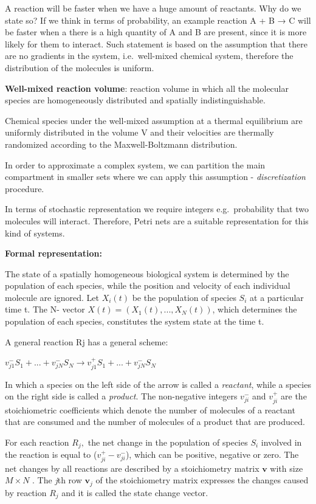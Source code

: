 A reaction will be faster when we have a huge amount of reactants. Why
do we state so? If we think in terms of probability, an example reaction
A + B → C will be faster when a there is a high quantity of A and B are
present, since it is more likely for them to interact. Such statement is
based on the assumption that there are no gradients in the system,
i.e.~well-mixed chemical system, therefore the distribution of the
molecules is uniform.

\textbf{Well-mixed reaction volume}: reaction volume in which all the
molecular species are homogeneously distributed and spatially
indistinguishable.

Chemical species under the well-mixed assumption at a thermal
equilibrium are uniformly distributed in the volume V and their
velocities are thermally randomized according to the Maxwell-Boltzmann
distribution.

In order to approximate a complex system, we can partition the main
compartment in smaller sets where we can apply this assumption -
\emph{discretization} procedure.

In terms of stochastic representation we require integers
e.g.~probability that two molecules will interact. Therefore, Petri nets
are a suitable representation for this kind of systems.

\textbf{Formal representation:}

The state of a spatially homogeneous biological system is determined by
the population of each species, while the position and velocity of each
individual molecule are ignored. Let $X_i(t)$ be the population of
species $S_i$ at a particular time t. The N- vector
$X(t) = (X_1(t),...,X_N(t))$, which determines the population of each
species, constitutes the system state at the time t.

A general reaction Rj has a general scheme:

$v^-_{j1}S_1+...+v^-_{jN}S_N \rightarrow v^+_{j1}S_1+...+v^-_{jN}S_N$

In which a species on the left side of the arrow is called a
\emph{reactant}, while a species on the right side is called a
\emph{product}. The non-negative integers $v^-_{ji}$ and $v^+_{ji}$ are
the stoichiometric coefficients which denote the number of molecules of
a reactant that are consumed and the number of molecules of a product
that are produced.

For each reaction $R_j,$ the net change in the population of species
$S_i$ involved in the reaction is equal to ($v^+_{ji} - v^-_{ji}$),
which can be positive, negative or zero. The net changes by all
reactions are described by a stoichiometry matrix $\mathbf{v}$ with size
$M × N$ . The \emph{j}th row $\mathbf{v}_j$ of the stoichiometry matrix
expresses the changes caused by reaction $R_j$ and it is called the
state change vector.

